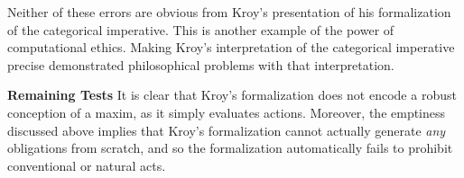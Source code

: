 \begin{isabellebody}
\begin{isamarkuptext}
        Neither of these errors are obvious from Kroy's presentation of his formalization of 
        the categorical imperative. This is another example of the power of computational ethics. Making
        Kroy's interpretation of the categorical imperative precise demonstrated philosophical problems
        with that interpretation.%
\end{isamarkuptext}\isamarkuptrue%
%
\begin{isamarkuptext}%
\noindent \textbf{Remaining Tests} It is clear that Kroy's formalization does not encode a robust conception of a maxim, as it
simply evaluates actions. Moreover, the emptiness discussed above implies that Kroy's formalization 
cannot actually generate \emph{any} obligations from scratch, and so the formalization automatically
fails to prohibit conventional or natural acts. 


\end{isamarkuptext}
\end{isabellebody}
